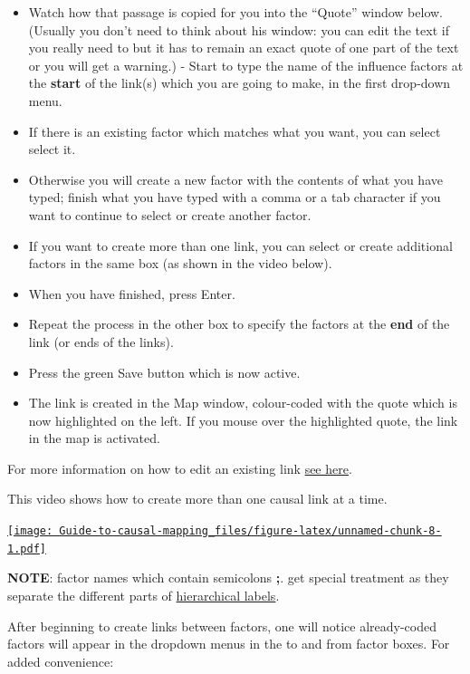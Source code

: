 \documentclass[
]{book}
\providecommand{\tightlist}{%
  \setlength{\itemsep}{0pt}\setlength{\parskip}{0pt}}
\begin{document}
\begin{itemize}
\tightlist
\item
  Watch how that passage is copied for you into the ``Quote'' window below. (Usually you don't need to think about his window: you can edit the text if you really need to but it has to remain an exact quote of one part of the text or you will get a warning.) - Start to type the name of the influence factors at the \textbf{start} of the link(s) which you are going to make, in the first drop-down menu.
\item
  If there is an existing factor which matches what you want, you can select select it.
\item
  Otherwise you will create a new factor with the contents of what you have typed; finish what you have typed with a comma or a tab character if you want to continue to select or create another factor.
\item
  If you want to create more than one link, you can select or create additional factors in the same box (as shown in the video below).
\item
  When you have finished, press Enter.
\item
  Repeat the process in the other box to specify the factors at the \textbf{end} of the link (or ends of the links).
\item
  Press the green Save button which is now active.
\item
  The link is created in the Map window, colour-coded with the quote which is now highlighted on the left. If you mouse over the highlighted quote, the link in the map is activated.
\end{itemize}

For more information on how to edit an existing link \protect\hyperlink{xedit-factor-and-links}{see here}.

This video shows how to create more than one causal link at a time.

\href{https://player.vimeo.com/video/588851236}{\texttt{[image: Guide-to-causal-mapping\_files/figure-latex/unnamed-chunk-8-1.pdf]}}

\textbf{NOTE}: factor names which contain semicolons \textbf{;}. get special treatment as they separate the different parts of \protect\hyperlink{xhierachical-coding}{hierarchical labels}.

After beginning to create links between factors, one will notice already-coded factors will appear in the dropdown menus in the to and from factor boxes. For added convenience:
\end{document}
